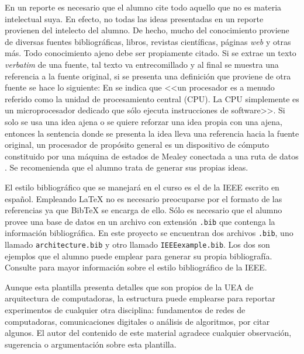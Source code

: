 \documentclass[12pt]{article}
\begin{document}
En un reporte es necesario que el alumno cite todo aquello que no es materia 
intelectual suya. En efecto, no todas las ideas presentadas en un reporte 
provienen del intelecto del alumno. De hecho, mucho del conocimiento proviene 
de diversas fuentes bibliográficas, \eg libros, revistas científicas, 
páginas \textit{web} y otras más. Todo conocimiento ajeno debe ser propiamente 
citado. Si se extrae un texto \textit{verbatim} de una fuente, tal texto va 
entrecomillado y al final se muestra una referencia a la fuente original, \eg 
si se presenta una definición que proviene de otra fuente se hace lo siguiente: 
En \cite{HwEn05} se indica que <<un procesador es a menudo referido como la 
unidad de procesamiento central (CPU). La CPU simplemente es un microprocesador 
dedicado que sólo ejecuta instrucciones de software>>. Si solo se usa una idea 
ajena o se quiere reforzar una idea propia con una ajena, entonces la sentencia 
donde se presenta la idea lleva una referencia hacia la fuente original, \eg 
un procesador de propósito general es un dispositivo de cómputo constituido por 
una máquina de estados de Mealey conectada a una ruta de datos 
\cite{HwEn05,MuMi07,StWi13}. Se recomenienda que el alumno trata de generar sus 
propias ideas.

El estilo bibliográfico que se manejará en el curso es el de la IEEE escrito en 
español. Empleando LaTeX no es necesario preocuparse por el formato de las 
referencias ya que BibTeX se encarga de ello. Sólo es necesario que el alumno 
provee una base de datos en un archivo con extensión \texttt{.bib} que contenga 
la información bibliográfica. En este proyecto se encuentran dos archivos 
\texttt{.bib}, uno llamado \texttt{architecture.bib} y otro llamado 
\texttt{IEEEexample.bib}. Los dos son ejemplos que el alumno puede emplear para 
generar su propia bibliografía. Consulte \cite{PaPa14} para mayor información 
sobre el estilo bibliográfico de la IEEE.

Aunque esta plantilla presenta detalles que son propios de la UEA de 
arquitectura de computadoras, la estructura puede emplearse para reportar 
experimentos de cualquier otra disciplina: fundamentos de redes de computadoras, 
comunicaciones digitales o análisis de algoritmos, por citar algunos. El autor 
del contenido de este material agradece cualquier observación, sugerencia o 
argumentación sobre esta plantilla.



\end{document}
